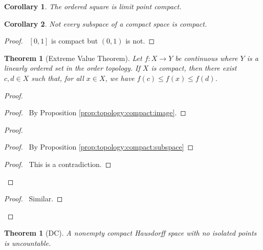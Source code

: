 \documentclass{report}
\let\qed\relax
\newtheorem{thm}[lm]{Theorem}
\newtheorem{cor}{Corollary}[lm]
\theoremstyle{definition}
\begin{document}
 \begin{cor}
  The ordered square is limit point compact.
 \end{cor}

\begin{cor}
  Not every subspace of a compact space is compact.
\end{cor}

\begin{proof}
  \pf\ $[0,1]$ is compact but $(0,1)$ is not. \qed
\end{proof}

  \begin{thm}[Extreme Value Theorem]
    Let $f : X \rightarrow Y$ be continuous where $Y$ is a linearly ordered set
    in the order topology. If $X$ is compact, then there exist $c, d \in X$
    such
    that, for all $x \in X$, we have $f(c) \leq f(x) \leq f(d)$.
  \end{thm}

  \begin{proof}
    \pf
    \begin{proof}
      \pf\ By Proposition \ref{prop:topology:compact:image}.
    \end{proof}
    \begin{proof}
      \begin{proof}
        \pf\ By Proposition \ref{prop:topology:compact:subspace}
      \end{proof}
      \qedstep
      \begin{proof}
        \pf\ This is a contradiction.
      \end{proof}
    \end{proof}
    \begin{proof}
      \pf\ Similar.
    \end{proof}
    \qed
  \end{proof}

  \begin{thm}[DC]
    A nonempty compact Hausdorff space with no isolated points is uncountable.
  \end{thm}
\end{document}
